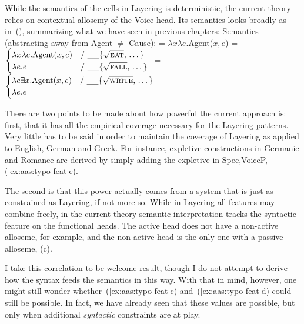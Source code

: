While the semantics of the cells in Layering is deterministic, the current theory relies on contextual allosemy of the Voice head. Its semantics looks broadly as in~(\nextx), summarizing what we have seen in previous chapters:
\pex Semantics (abstracting away from Agent $\neq$ Cause):
	\a \denote{\vd} = $\lambda x \lambda e$.Agent($x,e$)
	\a {}\phantom{.......} = $\begin{cases}
		\lambda x \lambda e.\text{Agent}(x,e) & \text{/ \trace \{\root{\gsc{eat}}, \dots\} }\\
		\lambda e.e & \text{/ \trace \{\root{\gsc{fall}}, \dots\} }\\
	\end{cases}$
	\a \denote{\vz}\phantom{.} = $\begin{cases}
		\lambda e \exists x.\text{Agent}(x,e) & \text{/ \trace \{\root{\gsc{write}}, \dots\} }\\
		\lambda e.e & \\
	\end{cases}$
\xe

There are two points to be made about how powerful the current approach is: first, that it has all the empirical coverage necessary for the Layering patterns. Very little has to be said in order to maintain the coverage of Layering as applied to English, German and Greek. For instance, expletive constructions in Germanic and Romance are derived by simply adding the expletive in Spec,VoiceP, (\ref{ex:aas:typo-feat}e).

The second is that this power actually comes from a system that is just as constrained as Layering, if not more so. While in Layering all features may combine freely, in the current theory semantic interpretation tracks the syntactic feature on the functional heads. The active {\vd} head does not have a non-active alloseme, for example, and the non-active {\vz} head is the only one with a passive alloseme, (\lastx c).

I take this correlation to be welcome result, though I do not attempt to derive how the syntax feeds the semantics in this way. With that in mind, however, one might still wonder whether~(\ref{ex:aas:typo-feat}c) and~(\ref{ex:aas:typo-feat}d) could still be possible. In fact, we have already seen that these values are possible, but only when additional \emph{syntactic} constraints are at play.

